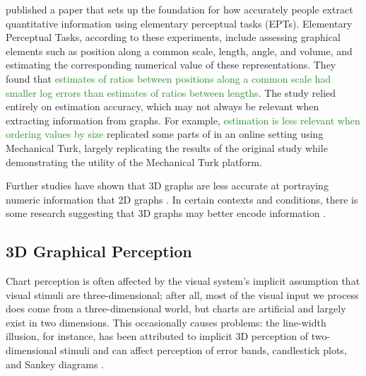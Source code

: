 \documentclass[letterpaper,inpress,dvipsnames]{jdsart}
\begin{document}
\citet{cleveland_graphical_1984} published a paper that sets up the foundation for how accurately people extract quantitative information using elementary perceptual tasks (EPTs).
Elementary Perceptual Tasks, according to these experiments, include assessing graphical elements such as position along a common scale, length, angle, and volume, and estimating the corresponding numerical value of these representations.
They found that {\textcolor{ForestGreen}{estimates of ratios between positions along a common scale had smaller log errors than estimates of ratios between lengths}}. The study relied entirely on estimation accuracy, which may not always be relevant when extracting information from graphs. For example, {\textcolor{ForestGreen}{estimation is less relevant when ordering values by size}}
\citet{heerCrowdsourcingGraphicalPerception2010b} replicated some parts of \citet{cleveland_graphical_1984} in an online setting using Mechanical Turk, largely replicating the results of the original study while demonstrating the utility of the Mechanical Turk platform.

Further studies have shown that 3D graphs are less accurate at portraying numeric information that 2D graphs \citep{barfield_effects_1989, fisher_data_1997}. In certain contexts and conditions, there is some research suggesting that 3D graphs may better encode information \citep{brath_3d_2014}.

\hypertarget{d-graphical-perception}{%
\subsection{3D Graphical Perception}\label{d-graphical-perception}}

Chart perception is often affected by the visual system's implicit assumption that visual stimuli are three-dimensional; after all, most of the visual input we process does come from a three-dimensional world, but charts are artificial and largely exist in two dimensions.
This occasionally causes problems: the line-width illusion, for instance, has been attributed to implicit 3D perception of two-dimensional stimuli and can affect perception of error bands, candlestick plots, and Sankey diagrams \citep{vanderplasSignsSineIllusion2015, daySineIllusion1991, hofmannCommonAnglePlots2013}.
\end{document}

